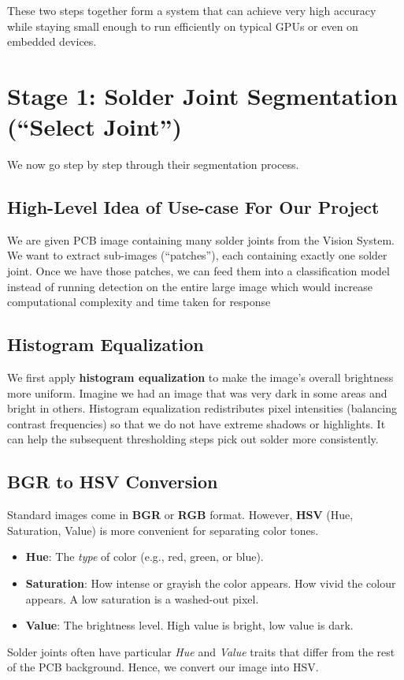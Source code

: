 \documentclass{article}
\begin{document}
These two steps together form a system that can achieve very high accuracy while staying small enough to run efficiently on typical GPUs or even on embedded devices.

\section{Stage 1: Solder Joint Segmentation (``Select Joint'')}
\label{sec:stage1}

We now go step by step through their segmentation process. 

\subsection{High-Level Idea of Use-case For Our Project}

We are given PCB image containing many solder joints from the Vision System. 
We want to extract sub-images (``patches''), each containing exactly one solder joint. 
Once we have those patches, we can feed them into a classification model instead of running detection on the entire large image which would increase computational complexity and time taken for response

\subsection{Histogram Equalization}

We first apply \textbf{histogram equalization} to make the image’s overall brightness more uniform. 
Imagine we had an image that was very dark in some areas and bright in others. 
Histogram equalization redistributes pixel intensities (balancing contrast frequencies) so that we do not have extreme shadows or highlights. 
It can help the subsequent thresholding steps pick out solder more consistently.

\subsection{BGR to HSV Conversion}

Standard images come in \textbf{BGR} or \textbf{RGB} format. 
However, \textbf{HSV} (Hue, Saturation, Value) is more convenient for separating color tones. 
\begin{itemize}
    \item \textbf{Hue}: The \emph{type} of color (e.g., red, green, or blue).
    \item \textbf{Saturation}: How intense or grayish the color appears. How vivid the colour appears. A low saturation is a washed-out pixel.
    \item \textbf{Value}: The brightness level. High value is bright, low value is dark.
\end{itemize}
Solder joints often have particular \emph{Hue} and \emph{Value} traits that differ from the rest of the PCB background. 
Hence, we convert our image into HSV.
\end{document}

